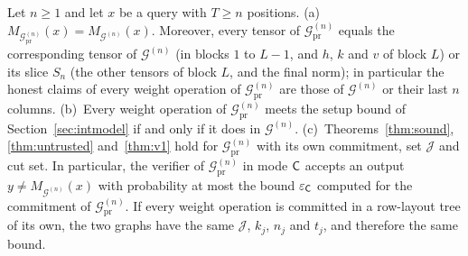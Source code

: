 \begin{theorem}
\label{thm:prune}
Let $n\ge1$ and let $x$ be a query with $T\ge n$ positions.
(a)~$M_{\mathcal G^{(n)}_{\mathrm{pr}}}(x)=M_{\mathcal G^{(n)}}(x)$. Moreover, every tensor of
$\mathcal G^{(n)}_{\mathrm{pr}}$ equals the corresponding tensor of $\mathcal G^{(n)}$ (in blocks
$1$ to $L-1$, and $h$, $k$ and $v$ of block $L$) or its slice $S_n$ (the other tensors of block
$L$, and the final norm); in particular the honest claims of every weight operation of $\mathcal G^{(n)}_{\mathrm{pr}}$
are those of $\mathcal G^{(n)}$ or their last $n$ columns.
(b)~Every weight operation of $\mathcal G^{(n)}_{\mathrm{pr}}$ meets the setup bound of
Section~\ref{sec:intmodel} if and only if it does in $\mathcal G^{(n)}$.
(c)~Theorems~\ref{thm:sound}, \ref{thm:untrusted} and~\ref{thm:v1} hold for
$\mathcal G^{(n)}_{\mathrm{pr}}$ with its own commitment, set $\mathcal J$ and cut set. In
particular, the verifier of $\mathcal G^{(n)}_{\mathrm{pr}}$ in mode $\mathsf{C}$ accepts an output
$y\neq M_{\mathcal G^{(n)}}(x)$ with probability at most the bound $\varepsilon_{\mathsf{C}}$ computed for
the commitment of $\mathcal G^{(n)}_{\mathrm{pr}}$. If every weight operation is committed in a
row-layout tree of its own, the two graphs have the same $\mathcal J$, $k_j$, $n_j$ and $t_j$, and
therefore the same bound.
\end{theorem}

